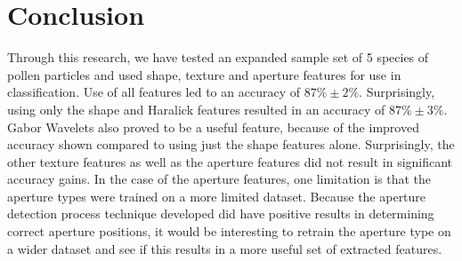 \section{Conclusion}

Through this research, we have tested an expanded sample set of 5 species of pollen particles and used shape, texture and aperture features for use in classification. Use of all features led to an accuracy of $87\% \pm 2\%$. Surprisingly, using only the shape and Haralick features resulted in an accuracy of $87\% \pm 3\%$. Gabor Wavelets also proved to be a useful feature, because of the improved accuracy shown compared to using just the shape features alone. Surprisingly, the other texture features as well as the aperture features did not result in significant accuracy gains. In the case of the aperture features, one limitation is that the aperture types were trained on a more limited dataset. Because the aperture detection process technique developed did have positive results in determining correct aperture positions, it would be interesting to retrain the aperture type on a wider dataset and see if this results in a more useful set of extracted features. 
    
  
  